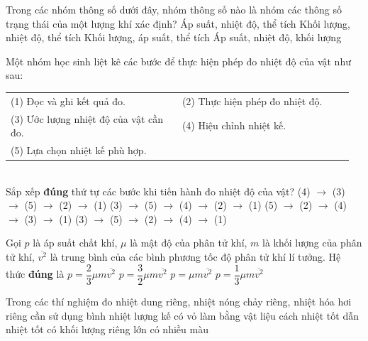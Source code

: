 	\begin{ex}%
		Trong các nhóm thông số dưới đây, nhóm thông số nào là nhóm các thông số trạng thái của một lượng khí xác định?
		\choice
		{\True Áp suất, nhiệt độ, thể tích}
		{Khối lượng, nhiệt độ, thể tích}
		{Khối lượng, áp suất, thể tích}
		{Áp suất, nhiệt độ, khối lượng}
	\end{ex}

	\begin{ex}%
		Một nhóm học sinh liệt kê các bước để thực hiện phép đo nhiệt độ của vật như sau:
		\par\noindent
		\begin{tabular}{@{}p{0.48\linewidth}p{0.48\linewidth}@{}}
			(1) Đọc và ghi kết quả đo. & (2) Thực hiện phép đo nhiệt độ.\\
			(3) Ước lượng nhiệt độ của vật cần đo. & (4) Hiệu chỉnh nhiệt kế.\\
			(5) Lựa chọn nhiệt kế phù hợp. &
		\end{tabular}\\
		Sắp xếp \textbf{đúng} thứ tự các bước khi tiến hành đo nhiệt độ của vật?
		\choice
		{(4) $\to$ (3) $\to$ (5) $\to$ (2) $\to$ (1)}
		{\True (3) $\to$ (5) $\to$ (4) $\to$ (2) $\to$ (1)}
		{(5) $\to$ (2) $\to$ (4) $\to$ (3) $\to$ (1)}
		{(3) $\to$ (5) $\to$ (2) $\to$ (4) $\to$ (1)}
	\end{ex}

	\begin{ex}%
		Gọi $p$ là áp suất chất khí, $\mu$ là mật độ của phân tử khí, $m$ là khối lượng của phân tử khí, $\overline{v^2}$ là trung bình của các bình phương tốc độ phân tử khí lí tưởng. Hệ thức \textbf{đúng} là
		\choice
		{$p=\dfrac{2}{3}\mu m\overline{v^2}$}
		{$p=\dfrac{3}{2}\mu m\overline{v^2}$}
		{$p=\mu m\overline{v^2}$}
		{\True $p=\dfrac{1}{3}\mu m\overline{v^2}$}
	\end{ex}

	\begin{ex}%
		Trong các thí nghiệm đo nhiệt dung riêng, nhiệt nóng chảy riêng, nhiệt hóa hơi riêng cần sử dụng bình nhiệt lượng kế có vỏ làm bằng vật liệu
		\choice
		{\True cách nhiệt tốt}
		{dẫn nhiệt tốt}
		{có khối lượng riêng lớn}
		{có nhiều màu}
	\end{ex}

